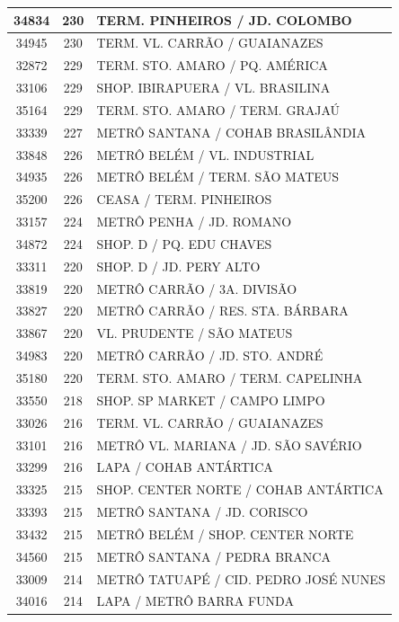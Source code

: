 \documentclass[
	12pt,				%
	oneside,			%
	a4paper,			%
	english,			%
	brazil				%
	]{abntex2ppgsi}
\begin{document}
{{\begin{apendicesenv}
\begin{longtable}{c|c|p{7cm}}
 \hline 
34834 &	230 &	TERM. PINHEIROS / JD. COLOMBO \\ 
 \hline 
34945 &	230 &	TERM. VL. CARRÃO / GUAIANAZES \\ 
 \hline 
32872 &	229 &	TERM. STO. AMARO / PQ. AMÉRICA \\ 
 \hline 
33106 &	229 &	SHOP. IBIRAPUERA / VL. BRASILINA \\ 
 \hline 
35164 &	229 &	TERM. STO. AMARO / TERM. GRAJAÚ \\ 
 \hline 
33339 &	227 &	METRÔ SANTANA / COHAB BRASILÂNDIA \\ 
 \hline 
33848 &	226 &	METRÔ BELÉM / VL. INDUSTRIAL \\ 
 \hline 
34935 &	226 &	METRÔ BELÉM / TERM. SÃO MATEUS \\ 
 \hline 
35200 &	226 &	CEASA / TERM. PINHEIROS \\ 
 \hline 
33157 &	224 &	METRÔ PENHA / JD. ROMANO \\ 
 \hline 
34872 &	224 &	SHOP. D / PQ. EDU CHAVES \\ 
 \hline 
33311 &	220 &	SHOP. D / JD. PERY ALTO \\ 
 \hline 
33819 &	220 &	METRÔ CARRÃO / 3A. DIVISÃO \\ 
 \hline 
33827 &	220 &	METRÔ CARRÃO / RES. STA. BÁRBARA \\ 
 \hline 
33867 &	220 &	VL. PRUDENTE / SÃO MATEUS \\ 
 \hline 
34983 &	220 &	METRÔ CARRÃO / JD. STO. ANDRÉ \\ 
 \hline 
35180 &	220 &	TERM. STO. AMARO / TERM. CAPELINHA \\ 
 \hline 
33550 &	218 &	SHOP. SP MARKET / CAMPO LIMPO \\ 
 \hline 
33026 &	216 &	TERM. VL. CARRÃO / GUAIANAZES \\ 
 \hline 
33101 &	216 &	METRÔ VL. MARIANA / JD. SÃO SAVÉRIO \\ 
 \hline 
33299 &	216 &	LAPA / COHAB ANTÁRTICA \\ 
 \hline 
33325 &	215 &	SHOP. CENTER NORTE / COHAB ANTÁRTICA \\ 
 \hline 
33393 &	215 &	METRÔ SANTANA / JD. CORISCO \\ 
 \hline 
33432 &	215 &	METRÔ BELÉM / SHOP. CENTER NORTE \\ 
 \hline 
34560 &	215 &	METRÔ SANTANA / PEDRA BRANCA \\ 
 \hline 
33009 &	214 &	METRÔ TATUAPÉ / CID. PEDRO JOSÉ NUNES \\ 
 \hline 
34016 &	214 &	LAPA / METRÔ BARRA FUNDA \\ 

\end{longtable}
\end{apendicesenv}}}
\end{document}
